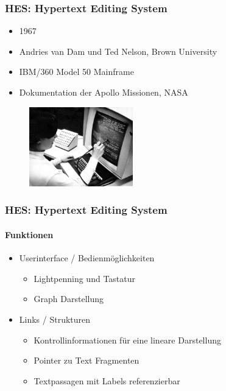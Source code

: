 \begin{frame}
\frametitle{HES: Hypertext Editing System}
\begin{itemize}
	\item 1967
	\item Andries van Dam und Ted Nelson, Brown University
	\item IBM/360 Model 50 Mainframe
	\item Dokumentation der Apollo Missionen, NASA
\end{itemize}

\begin{figure}[htbp]
	\centering
	\includegraphics[width=0.40\textwidth]{images/hes}
\end{figure}

\end{frame}

\begin{frame}
\frametitle{HES: Hypertext Editing System}
\framesubtitle{Funktionen}
	\begin{itemize}
		\item Userinterface / Bedienmöglichkeiten
		\begin{itemize}
			\item Lightpenning und Tastatur
			\item Graph Darstellung
		\end{itemize}
		\item Links / Strukturen
		\begin{itemize}
			\item Kontrollinformationen für eine lineare Darstellung
			\item Pointer zu Text Fragmenten
			\item Textpassagen mit Labels referenzierbar
		\end{itemize}
	\end{itemize}
\end{frame}

